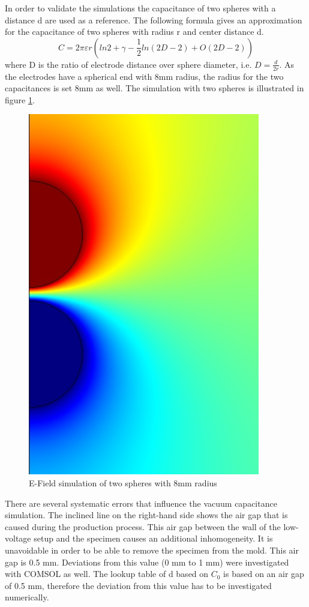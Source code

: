 In order to validate the simulations the capacitance of two spheres with a distance d are used as a reference. The following formula gives an approximation for the capacitance of two spheres with radius r and center distance d. \cite{Rawlins}
\begin{equation}
C=2 \pi \varepsilon r ( ln 2 + \gamma -\frac{1}{2} ln(2D-2)+O(2D-2))
\end{equation}
where D is the ratio of electrode distance over sphere diameter, i.e. $ D=\frac{d}{2r}$. As the electrodes have a spherical end with 8mm radius, the radius for the two capacitances is set 8mm as well. The simulation with two spheres is illustrated in figure \ref{fig.twospheres}.  
\begin{figure}[htbp]
	\centering
	\includegraphics[scale=0.3]{figures/Method/Part1_d_C0/sphere_capacity.jpg}		
	\caption[Kurze Abbildungsbeschreibung]{E-Field simulation of two spheres with 8mm radius } \label{fig.comsol_sphere}
	\label{fig.twospheres}
\end{figure}


 There are several systematic errors that influence the vacuum capacitance simulation. The inclined line on the right-hand side shows the air gap that is caused during the production process. This air gap between the wall of the low-voltage setup and the specimen causes an additional inhomogeneity. It is unavoidable in order to be able to remove the specimen from the mold. This air gap is 0.5 mm. Deviations from this value (0 mm to 1 mm) were investigated with COMSOL as well. The lookup table of d based on $C_0$ is based on an air gap of 0.5 mm, therefore the deviation from this value has to be investigated numerically.
 
